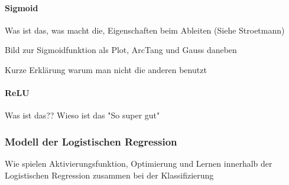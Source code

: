 \paragraph{Sigmoid}
Was ist das, was macht die, Eigenschaften beim Ableiten (Siehe Stroetmann)

Bild zur Sigmoidfunktion als Plot, ArcTang und Gauss daneben

Kurze Erklärung warum man nicht die anderen benutzt
\paragraph{ReLU}
Was ist das?? Wieso ist das "So super gut"
\subsubsection{Modell der Logistischen Regression}
Wie spielen Aktivierungsfunktion, Optimierung und Lernen innerhalb der Logistischen Regression zusammen bei der Klassifizierung
